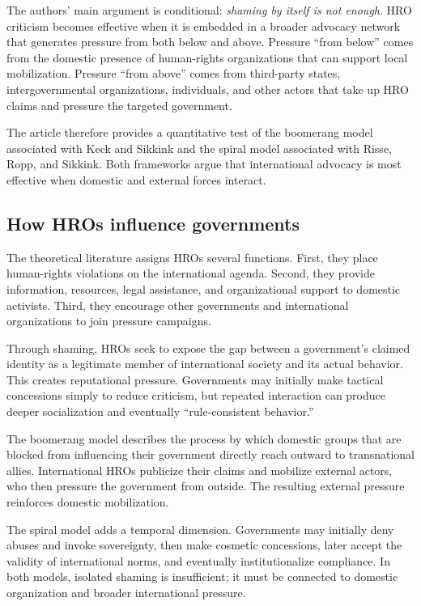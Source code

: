 The authors' main argument is conditional: \textit{shaming by itself is not enough}. HRO criticism becomes effective when it is embedded in a broader advocacy network that generates pressure from both below and above. Pressure ``from below'' comes from the domestic presence of human-rights organizations that can support local mobilization. Pressure ``from above'' comes from third-party states, intergovernmental organizations, individuals, and other actors that take up HRO claims and pressure the targeted government.

The article therefore provides a quantitative test of the boomerang model associated with Keck and Sikkink and the spiral model associated with Risse, Ropp, and Sikkink. Both frameworks argue that international advocacy is most effective when domestic and external forces interact.

\subsection{How HROs influence governments}

The theoretical literature assigns HROs several functions. First, they place human-rights violations on the international agenda. Second, they provide information, resources, legal assistance, and organizational support to domestic activists. Third, they encourage other governments and international organizations to join pressure campaigns.

Through shaming, HROs seek to expose the gap between a government's claimed identity as a legitimate member of international society and its actual behavior. This creates reputational pressure. Governments may initially make tactical concessions simply to reduce criticism, but repeated interaction can produce deeper socialization and eventually ``rule-consistent behavior.''

The boomerang model describes the process by which domestic groups that are blocked from influencing their government directly reach outward to transnational allies. International HROs publicize their claims and mobilize external actors, who then pressure the government from outside. The resulting external pressure reinforces domestic mobilization.

The spiral model adds a temporal dimension. Governments may initially deny abuses and invoke sovereignty, then make cosmetic concessions, later accept the validity of international norms, and eventually institutionalize compliance. In both models, isolated shaming is insufficient; it must be connected to domestic organization and broader international pressure.

